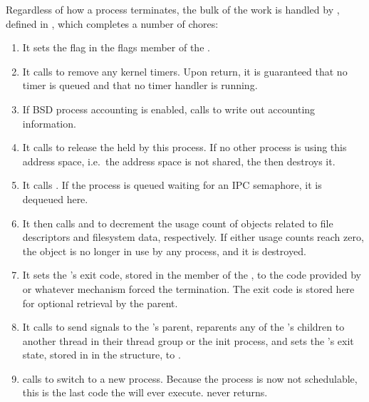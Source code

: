 Regardless of how a process terminates, the bulk of the work is handled by , defined in , which completes a number of chores:
\begin{enumerate}
\item It sets the  flag in the flags member of the .
\item It calls  to remove any kernel timers.
  Upon return, it is guaranteed that no timer is queued and that no timer handler is running.
\item If BSD process accounting is enabled,  calls  to write out accounting information.
\item It calls  to release the  held by this process.
  If no other process is using this address space, i.e.\ the address space is not shared, the  then destroys it.
\item It calls .
  If the process is queued waiting for an IPC semaphore, it is dequeued here.
\item It then calls  and  to decrement the usage count of objects related to file descriptors and filesystem data, respectively.
  If either usage counts reach zero, the object is no longer in use by any process, and it is destroyed.
\item It sets the ’s exit code, stored in the  member of the , to the code provided by  or whatever  mechanism forced the termination.
  The exit code is stored here for optional retrieval by the parent.
\item It calls  to send signals to the ’s parent, reparents any of the ’s children to another thread in their thread group or the init process, and sets the ’s exit state, stored in  in the  structure, to .
\item {} calls  to switch to a new process.
  Because the process is now not schedulable, this is the last code the  will ever execute.
   never returns.
\end{enumerate}

